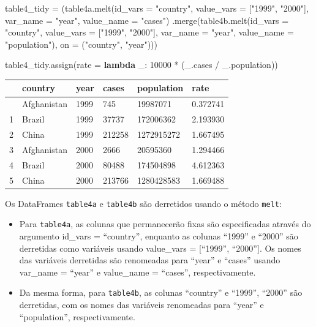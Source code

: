 \documentclass[
  portuguese,
  letterpaper,
  DIV=11,
  numbers=noendperiod]{scrreprt}
\newenvironment{Shaded}{\begin{snugshade}}{\end{snugshade}}
\newcommand{\DecValTok}[1]{\textcolor[rgb]{0.68,0.00,0.00}{#1}}
\newcommand{\KeywordTok}[1]{\textcolor[rgb]{0.00,0.23,0.31}{\textbf{#1}}}
\newcommand{\NormalTok}[1]{\textcolor[rgb]{0.00,0.23,0.31}{#1}}
\newcommand{\OperatorTok}[1]{\textcolor[rgb]{0.37,0.37,0.37}{#1}}
\newcommand{\StringTok}[1]{\textcolor[rgb]{0.13,0.47,0.30}{#1}}
\theoremstyle{definition}
\theoremstyle{remark}
\begin{document}
\begin{Shaded}
\begin{Highlighting}[]
\NormalTok{table4\_tidy }\OperatorTok{=}\NormalTok{ (table4a.melt(id\_vars }\OperatorTok{=} \StringTok{"country"}\NormalTok{, value\_vars }\OperatorTok{=}\NormalTok{ [}\StringTok{"1999"}\NormalTok{, }\StringTok{"2000"}\NormalTok{], var\_name }\OperatorTok{=} \StringTok{"year"}\NormalTok{, value\_name }\OperatorTok{=} \StringTok{"cases"}\NormalTok{)}
\NormalTok{                .merge(table4b.melt(id\_vars }\OperatorTok{=} \StringTok{"country"}\NormalTok{, value\_vars }\OperatorTok{=}\NormalTok{ [}\StringTok{"1999"}\NormalTok{, }\StringTok{"2000"}\NormalTok{], var\_name }\OperatorTok{=} \StringTok{"year"}\NormalTok{, value\_name }\OperatorTok{=} \StringTok{"population"}\NormalTok{),}
\NormalTok{                       on }\OperatorTok{=}\NormalTok{ (}\StringTok{"country"}\NormalTok{, }\StringTok{"year"}\NormalTok{)))}

\NormalTok{table4\_tidy.assign(rate }\OperatorTok{=} \KeywordTok{lambda}\NormalTok{ \_: }\DecValTok{10000} \OperatorTok{*}\NormalTok{ (\_.cases }\OperatorTok{/}\NormalTok{ \_.population))}
\end{Highlighting}
\end{Shaded}

\begin{longtable}[]{@{}llllll@{}}
\toprule\noalign{}
& country & year & cases & population & rate \\
\midrule\noalign{}
\endhead
\bottomrule\noalign{}
\endlastfoot
0 & Afghanistan & 1999 & 745 & 19987071 & 0.372741 \\
1 & Brazil & 1999 & 37737 & 172006362 & 2.193930 \\
2 & China & 1999 & 212258 & 1272915272 & 1.667495 \\
3 & Afghanistan & 2000 & 2666 & 20595360 & 1.294466 \\
4 & Brazil & 2000 & 80488 & 174504898 & 4.612363 \\
5 & China & 2000 & 213766 & 1280428583 & 1.669488 \\
\end{longtable}

Os DataFrames \texttt{table4a} e \texttt{table4b} são derretidos usando
o método \texttt{melt}:

\begin{itemize}
\item
  Para \texttt{table4a}, as colunas que permanecerão fixas são
  especificadas através do argumento id\_vars = ``country'', enquanto as
  colunas ``1999'' e ``2000'' são derretidas como variáveis usando
  value\_vars = {[}``1999'', ``2000''{]}. Os nomes das variáveis
  derretidas são renomeadas para ``year'' e ``cases'' usando var\_name =
  ``year'' e value\_name = ``cases'', respectivamente.
\item
  Da mesma forma, para \texttt{table4b}, as colunas ``country'' e
  ``1999'', ``2000'' são derretidas, com os nomes das variáveis
  renomeadas para ``year'' e ``population'', respectivamente.
\end{itemize}
\end{document}
